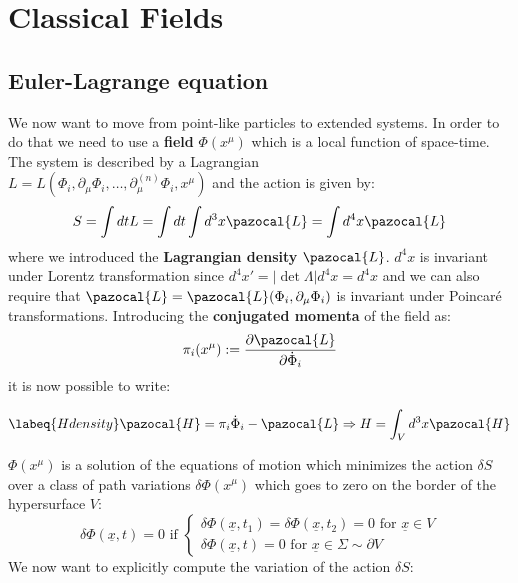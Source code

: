 \documentclass[../main.tex]{subfiles}
\begin{document}
\setchapterpreamble[u]{\margintoc}
\chapter[Classical Fields]{Classical Fields\footnotemark[0]}

\section{Euler-Lagrange equation}
We now want to move from point-like particles to extended systems. In order to do that we need to use a \textbf{field} $\Phi(x^{\mu})$ which is a local function of space-time. The system is described by a Lagrangian\\ $L=L(\Phi_i,\partial_{\mu}\Phi_i,\dots,\partial_{\mu}^{(n)}\Phi_i,x^{\mu})$ and the action is given by:
\[
S=\int dtL=\int dt\int d^3x\pazocal{L}=\int d^4x\pazocal{L}
\]
where we introduced the \textbf{Lagrangian density} $\pazocal{L}$. $d^4x$ is invariant under Lorentz transformation since $d^4x'=|\det\Lambda|d^4x=d^4x$ and we can also require that $\pazocal{L}=\pazocal{L}(\Phi_i,\partial_{\mu}\Phi_i)$ is invariant under Poincaré transformations. Introducing the \textbf{conjugated momenta} of the field as:
\[
\pi_i(x^{\mu}):=\frac{\partial\pazocal{L}}{\partial\Dot{\Phi}_i}
\]
it is now possible to write:
\begin{kaobox}[frametitle=Hamiltonian]
\begin{equation}
\labeq{Hdensity}
\pazocal{H}=\pi_i\Dot{\Phi}_i-\pazocal{L}\Rightarrow H=\int_Vd^3x\pazocal{H}
\end{equation}
\end{kaobox}
$\Phi(x^{\mu})$ is a solution of the equations of motion which minimizes the action $\delta S$ over a class of path variations $\delta\Phi(x^{\mu})$ which goes to zero on the border of the hypersurface $V$:
\[
\delta\Phi(\underline{x},t)=0 \text{ if } \begin{cases}
\delta\Phi(\underline{x},t_1)=\delta\Phi(\underline{x},t_2)=0 \text{ for } \underline{x}\in V\\
\delta\Phi(\underline{x},t)=0 \text{ for } \underline{x}\in\Sigma\sim\partial V
\end{cases}
\]
We now want to explicitly compute the variation of the action $\delta S$:
\end{document}
